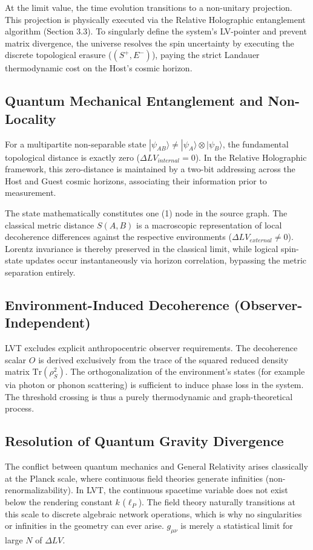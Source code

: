 \documentclass[12pt,a4paper]{article}
\begin{document}
At the limit value, the time evolution transitions to a non-unitary projection. This projection is physically executed via the Relative Holographic entanglement algorithm (Section 3.3). To singularly define the system's LV-pointer and prevent matrix divergence, the universe resolves the spin uncertainty by executing the discrete topological erasure ($(S^{+}, E^{-})$), paying the strict Landauer thermodynamic cost on the Host's cosmic horizon.

\subsection{Quantum Mechanical Entanglement and Non-Locality}

For a multipartite non-separable state $|\psi_{AB}\rangle \ne |\psi_A\rangle \otimes |\psi_B\rangle$, the fundamental topological distance is exactly zero ($\Delta LV_{internal} = 0$). In the Relative Holographic framework, this zero-distance is maintained by a two-bit addressing across the Host and Guest cosmic horizons, associating their information prior to measurement.

The state mathematically constitutes one (1) node in the source graph. The classical metric distance $S(A,B)$ is a macroscopic representation of local decoherence differences against the respective environments ($\Delta LV_{external} \ne 0$). Lorentz invariance is thereby preserved in the classical limit, while logical spin-state updates occur instantaneously via horizon correlation, bypassing the metric separation entirely.


\subsection{Environment-Induced Decoherence (Observer-Independent)}
LVT excludes explicit anthropocentric observer requirements. The decoherence scalar $O$ is derived exclusively from the trace of the squared reduced density matrix $\text{Tr}(\rho_S^2)$. The orthogonalization of the environment's states (for example via photon or phonon scattering) is sufficient to induce phase loss in the system. The threshold crossing is thus a purely thermodynamic and graph-theoretical process.

\subsection{Resolution of Quantum Gravity Divergence}
The conflict between quantum mechanics and General Relativity arises classically at the Planck scale, where continuous field theories generate infinities (non-renormalizability). In LVT, the continuous spacetime variable does not exist below the rendering constant $k$ ($\ell_P$). The field theory naturally transitions at this scale to discrete algebraic network operations, which is why no singularities or infinities in the geometry can ever arise. $g_{\mu\nu}$ is merely a statistical limit for large $N$ of $\Delta LV$.
\end{document}
